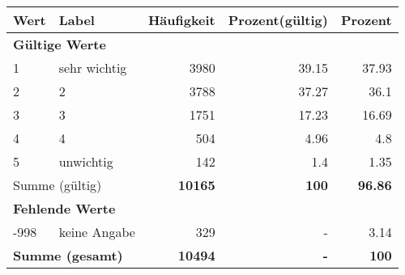      \begin{longtable}{lXrrr}
     \toprule
     \textbf{Wert} & \textbf{Label} & \textbf{Häufigkeit} & \textbf{Prozent(gültig)} & \textbf{Prozent} \\
     \endhead
     \midrule
     \multicolumn{5}{l}{\textbf{Gültige Werte}}\\

     1 &
     \multicolumn{1}{X}{ sehr wichtig   } &


       \num{3980} &
       \num[round-mode=places,round-precision=2]{39,15} &
         \num[round-mode=places,round-precision=2]{37,93} \\

     2 &
     \multicolumn{1}{X}{ 2   } &


       \num{3788} &
       \num[round-mode=places,round-precision=2]{37,27} &
         \num[round-mode=places,round-precision=2]{36,1} \\

     3 &
     \multicolumn{1}{X}{ 3   } &


       \num{1751} &
       \num[round-mode=places,round-precision=2]{17,23} &
         \num[round-mode=places,round-precision=2]{16,69} \\

     4 &
     \multicolumn{1}{X}{ 4   } &


       \num{504} &
       \num[round-mode=places,round-precision=2]{4,96} &
         \num[round-mode=places,round-precision=2]{4,8} \\

     5 &
     \multicolumn{1}{X}{ unwichtig   } &


       \num{142} &
       \num[round-mode=places,round-precision=2]{1,4} &
         \num[round-mode=places,round-precision=2]{1,35} \\
     \midrule
     \multicolumn{2}{l}{Summe (gültig)} &
       \textbf{\num{10165}} &
     \textbf{100} &
       \textbf{\num[round-mode=places,round-precision=2]{96,86}} \\
     \multicolumn{5}{l}{\textbf{Fehlende Werte}}\\
       -998 &
       keine Angabe &
         \num{329} &
        - &
         \num[round-mode=places,round-precision=2]{3,14} \\
     \midrule
     \multicolumn{2}{l}{\textbf{Summe (gesamt)}} &
          \textbf{\num{10494}} &
        \textbf{-} &
        \textbf{100} \\
     \bottomrule
     \end{longtable}
     
